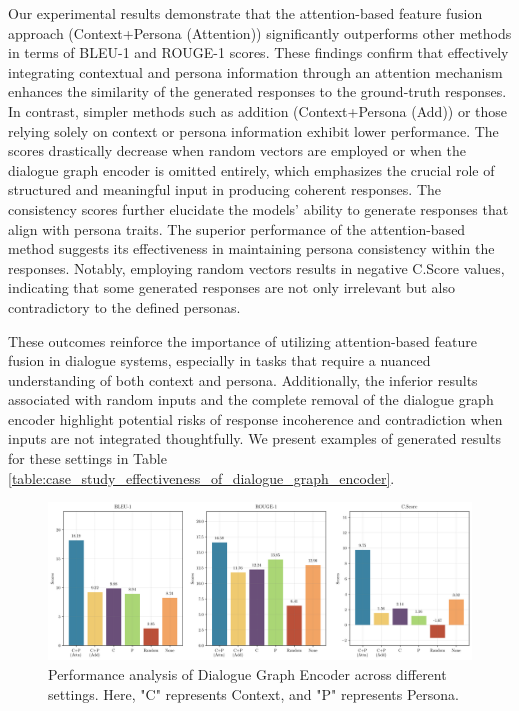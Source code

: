 Our experimental results demonstrate that the attention-based feature fusion approach (Context+Persona (Attention)) significantly outperforms other methods in terms of BLEU-1 and ROUGE-1 scores. These findings confirm that effectively integrating contextual and persona information through an attention mechanism enhances the similarity of the generated responses to the ground-truth responses. In contrast, simpler methods such as addition (Context+Persona (Add)) or those relying solely on context or persona information exhibit lower performance. The scores drastically decrease when random vectors are employed or when the dialogue graph encoder is omitted entirely, which emphasizes the crucial role of structured and meaningful input in producing coherent responses. The consistency scores further elucidate the models' ability to generate responses that align with persona traits. The superior performance of the attention-based method suggests its effectiveness in maintaining persona consistency within the responses. Notably, employing random vectors results in negative C.Score values, indicating that some generated responses are not only irrelevant but also contradictory to the defined personas.

These outcomes reinforce the importance of utilizing attention-based feature fusion in dialogue systems, especially in tasks that require a nuanced understanding of both context and persona. Additionally, the inferior results associated with random inputs and the complete removal of the dialogue graph encoder highlight potential risks of response incoherence and contradiction when inputs are not integrated thoughtfully. We present examples of generated results for these settings in Table \ref{table:case_study_effectiveness_of_dialogue_graph_encoder}.

\begin{figure}[H]
    \centering
    \includegraphics[width=1.0\textwidth]{./context/experiment/images/effectiveness_of_dialogue_graph_encoder.png}
    \caption{Performance analysis of Dialogue Graph Encoder across different settings. Here, "C" represents Context, and "P" represents Persona.}
    \label{fig:effectiveness_of_dialogue_graph_encoder}
\end{figure}

